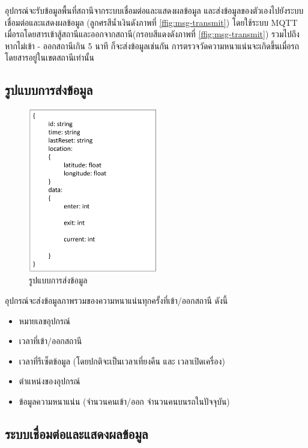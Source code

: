 อุปกรณ์จะรับข้อมูลพื้นที่สถานีจากระบบเชื่อมต่อและแสดงผลข้อมูล และส่งข้อมูลของตัวเองไปยังระบบเชื่อมต่อและแสดงผลข้อมูล (ลูกศรสีน้ำเงินดังภาพที่ \ref{ffig:msg-transmit}) โดยใช้ระบบ MQTT เมื่อรถโดยสารเข้าสู้สถานีและออกจากสถานี(กรอบสีแดงดังภาพที่ \ref{ffig:msg-transmit}) รวมไปถึงหากไม่เข้า - ออกสถานีเกิน 5 นาที ก็จะส่งข้อมูลเช่นกัน การตรวจวัดความหนาแน่นจะเกิดขึ้นเมื่อรถโดยสารอยู่ในเขตสถานีเท่านั้น

\subsection{รูปแบบการส่งข้อมูล}

\begin{figure}[h!]
  \begin{center}
    \includegraphics[width=0.5\textwidth]{data-schema.png}
  \end{center}
  \caption{รูปแบบการส่งข้อมูล}
  \label{fig:data-schema}
\end{figure}

อุปกรณ์จะส่งข้อมูลภาพรวมของความหนาแน่นทุกครั้งที่เข้า/ออกสถานี ดังนี้
\begin{itemize}
  \item หมายเลขอุปกรณ์
  \item เวลาที่เข้า/ออกสถานี
  \item เวลาที่รีเซ็ตข้อมูล (โดยปกติจะเป็นเวลาเที่ยงคืน และ เวลาเปิดเครื่อง)
  \item ตำแหน่งของอุปกรณ์
  \item ข้อมูลความหนาแน่น (จำนวนคนเข้า/ออก จำนวนคนบนรถในปัจจุบัน)
\end{itemize}

\subsection{ระบบเชื่อมต่อและแสดงผลข้อมูล}

